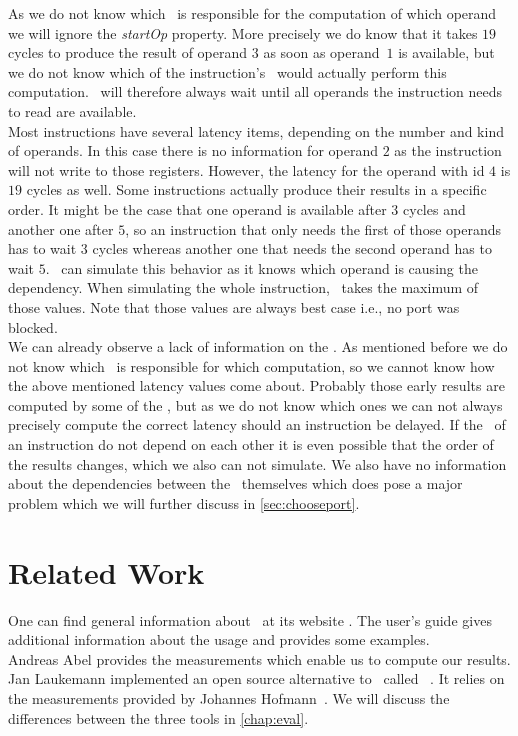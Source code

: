 As we do not know which \microop\ is responsible for the computation of which operand we will ignore the \emph{startOp} property. More precisely we do know that it takes $19$ cycles to produce the result of operand $3$ as soon as operand~$1$ is available, but we do not know which of the instruction's \microops\ would actually perform this computation. \suaca\ will therefore always wait until all operands the instruction needs to read are available.\\
Most instructions have several latency items, depending on the number and kind of operands. In this case there is no information for operand $2$ as the instruction will not write to those registers. However, the latency for the operand with id $4$ is $19$ cycles as well. Some instructions actually produce their results in a specific order. It might be the case that one operand is available after $3$ cycles and another one after $5$, so an instruction that only needs the first of those operands has to wait $3$ cycles whereas another one that needs the second operand has to wait $5$. \suaca\ can simulate this behavior as it knows which operand is causing the dependency. When simulating the whole instruction, \suaca\ takes the maximum of those values. Note that those values are always best case i.e., no port was blocked.\\
We can already observe a lack of information on the \microops. As mentioned before we do not know which \microop\ is responsible for which computation, so we cannot know how the above mentioned latency values come about. Probably those early results are computed by some of the \microops, but as we do not know which ones we can not always precisely compute the correct latency should an instruction be delayed. If the \microops\ of an instruction do not depend on each other it is even possible that the order of the results changes, which we also can not simulate. We also have no information about the dependencies between the \microops\ themselves which does pose a major problem which we will further discuss in \autoref{sec:chooseport}.
\newpage
\section{Related Work}

One can find general information about \iaca\ at its website \cite{iaca}. The user's guide \cite{userguide} gives additional information about the usage and provides some examples.\\

Andreas Abel \cite{Andreas} provides the measurements which enable us to compute our results.\\

Jan Laukemann \cite{osaca-thesis} implemented an open source alternative to \iaca\ called \osaca~\cite{osaca-web}. It relies on the measurements provided by Johannes Hofmann~\cite{ibench}. We will discuss the differences between the three tools in \autoref{chap:eval}.
